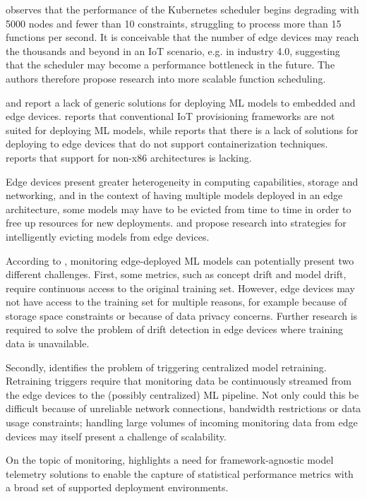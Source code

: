 \cite{Rausch2019a} observes that the performance of the Kubernetes scheduler begins degrading with 5000 nodes and fewer than 10 constraints, struggling to process more than 15 functions per second.
It is conceivable that the number of edge devices may reach the thousands and beyond in an IoT scenario, e.g. in industry 4.0, suggesting that the scheduler may become a performance bottleneck in the future.
The authors therefore propose research into more scalable function scheduling.

\cite{Bosch2021} and \cite{Rausch2019} report a lack of generic solutions for deploying ML models to embedded and edge devices.
\cite{Rausch2019} reports that conventional IoT provisioning frameworks are not suited for deploying ML models, while \cite{Gupta2020} reports that there is a lack of solutions for deploying to edge devices that do not support containerization techniques.
\cite{Rausch2019a} reports that support for non-x86 architectures is lacking.

Edge devices present greater heterogeneity in computing capabilities, storage and networking, and in the context of having multiple models deployed in an edge architecture, some models may have to be evicted from time to time in order to free up resources for new deployments.
\cite{Rausch2019} and \cite{Rausch2019a} propose research into strategies for intelligently evicting models from edge devices.

According to \cite{Rausch2019}, monitoring edge-deployed ML models can potentially present two different challenges.
First, some metrics, such as concept drift and model drift, require continuous access to the original training set.
However, edge devices may not have access to the training set for multiple reasons, for example because of storage space constraints or because of data privacy concerns.
Further research is required to solve the problem of drift detection in edge devices where training data is unavailable.

Secondly, \cite{Rausch2019} identifies the problem of triggering centralized model retraining.
Retraining triggers require that monitoring data be continuously streamed from the edge devices to the (possibly centralized) ML pipeline.
Not only could this be difficult because of unreliable network connections, bandwidth restrictions or data usage constraints; handling large volumes of incoming monitoring data from edge devices may itself present a challenge of scalability.

On the topic of monitoring, \cite{Chen2020} highlights a need for framework-agnostic model telemetry solutions to enable the capture of statistical performance metrics with a broad set of supported deployment environments.

